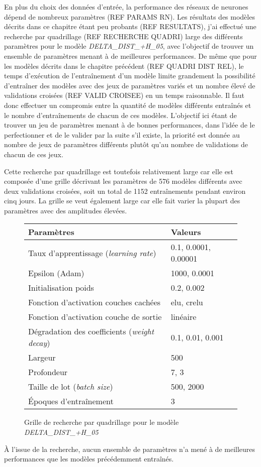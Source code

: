 
\par En plus du choix des données d'entrée, la performance des réseaux de neurones dépend de nombreux paramètres (REF PARAMS RN). Les résultats des modèles décrits dans ce chapitre étant peu probants (REF RESULTATS), j'ai effectué une recherche par quadrillage (REF RECHERCHE QUADRI) large des différents paramètres pour le modèle \emph{DELTA\_DIST\_+H\_05}, avec l'objectif de trouver un ensemble de paramètres menant à de meilleures performances. De même que pour les modèles décrits dans le chapitre précédent (REF QUADRI DIST REL), le temps d'exécution de l'entraînement d'un modèle limite grandement la possibilité d'entraîner des modèles avec des jeux de paramètres variés et un nombre élevé de validations croisées (REF VALID CROISEE) en un temps raisonnable. Il faut donc effectuer un compromis entre la quantité de modèles différents entraînés et le nombre d'entraînements de chacun de ces modèles. L'objectif ici étant de trouver un jeu de paramètres menant à de bonnes performances, dans l'idée de le perfectionner et de le valider par la suite s'il existe, la priorité est donnée au nombre de jeux de paramètres différents plutôt qu'au nombre de validations de chacun de ces jeux.

\par Cette recherche par quadrillage est toutefois relativement large car elle est composée d'une grille décrivant les paramètres de 576 modèles différents avec deux validations croisées, soit un total de 1152 entraînements pendant environ cinq jours. La grille se veut également large car elle fait varier la plupart des paramètres avec des amplitudes élevées.

\begin{figure}
	\centering
	
	\begin{tabular}{|l|l|}
		\hline
		\textbf{Paramètres} & \textbf{Valeurs} \\ \hline 
		Taux d'apprentissage (\textit{learning rate}) & 0.1, 0.0001, 0.00001 \\ \hline
		Epsilon (Adam) & 1000, 0.0001 \\ \hline
		Initialisation poids & 0.2, 0.002 \\ \hline
		Fonction d'activation couches cachées & elu, crelu \\ \hline
		Fonction d'activation couche de sortie & linéaire \\ \hline
		Dégradation des coefficients (\textit{weight decay}) & 0.1, 0.01, 0.001 \\ \hline
		Largeur & 500 \\ \hline
		Profondeur & 7, 3 \\ \hline
		Taille de lot (\textit{batch size}) & 500, 2000\\ \hline
		Époques d'entraînement & 3 \\ \hline
		
	\end{tabular}		
	
	\caption{Grille de recherche par quadrillage pour le modèle \emph{DELTA\_DIST\_+H\_05}}
\end{figure}

\par À l'issue de la recherche, aucun ensemble de paramètres n'a mené à de meilleures performances que les modèles précédemment entraînés.
